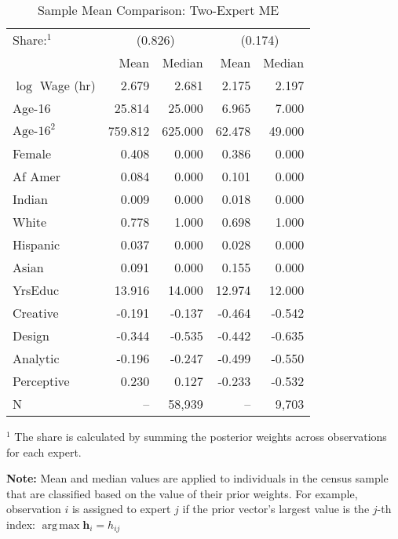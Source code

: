 \documentclass[12pt]{article}
\DeclareMathOperator*{\argmax}{arg\,max}
\theoremstyle{definition}
\begin{document}
  
  \begin{table} \centering
    \caption{Sample Mean Comparison: Two-Expert ME}
    \begin{threeparttable}
      \begin{tabular}[l]{l r r r r}
    \cmidrule{1-5}
    Share:$^{1}$& \multicolumn{2}{c}{(0.826)} & \multicolumn{2}{c}{(0.174)} \\
                & Mean & Median & Mean & Median \\
    \cmidrule{1-5}
    $\log$ Wage (hr)      &   2.679 &   2.681 &  2.175 &  2.197 \\
    Age-16                &  25.814 &  25.000 &  6.965 &  7.000 \\
    $\textrm{Age-16}^{2}$ & 759.812 & 625.000 & 62.478 & 49.000 \\
    Female                &   0.408 &   0.000 &  0.386 &  0.000 \\
    Af Amer               &   0.084 &   0.000 &  0.101 &  0.000 \\
    Indian                &   0.009 &   0.000 &  0.018 &  0.000 \\
    White                 &   0.778 &   1.000 &  0.698 &  1.000 \\
    Hispanic              &   0.037 &   0.000 &  0.028 &  0.000 \\
    Asian                 &   0.091 &   0.000 &  0.155 &  0.000 \\
    YrsEduc               &  13.916 &  14.000 & 12.974 & 12.000 \\
    Creative              &  -0.191 &  -0.137 & -0.464 & -0.542 \\
    Design                &  -0.344 &  -0.535 & -0.442 & -0.635 \\
    Analytic              &  -0.196 &  -0.247 & -0.499 & -0.550 \\
    Perceptive            &   0.230 &   0.127 & -0.233 & -0.532 \\
    \cmidrule{1-5}
    N                     &      -- &  58,939 &     -- &  9,703 \\
    \hline
      \end{tabular}
      \begin{tablenotes}
        \item{\footnotesize $^{1}$ The share is calculated by summing the 
        posterior weights across observations for each expert.}
        \item{\footnotesize \textbf{Note:} Mean and median values are applied to individuals in the census sample that are classified based on the value of their prior weights. For example, observation $i$ is assigned to expert $j$ if the prior vector's largest value is the $j$-th index: $\argmax \boldsymbol{h}_{i} = h_{ij}$}
      \end{tablenotes} \label{tbl:ME2_sample_comparison}
    \end{threeparttable}
  \end{table}
  
\end{document}
